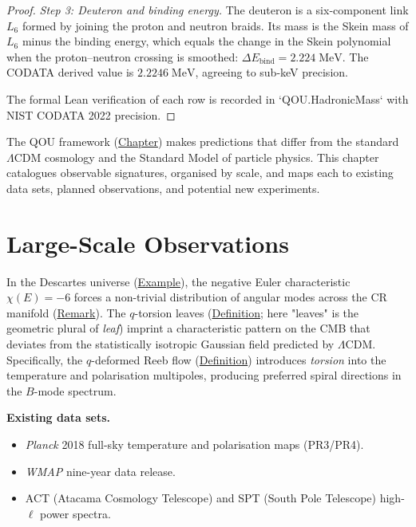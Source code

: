 \begin{proof}
\emph{Step 3: Deuteron and binding energy.}
The deuteron is a six-component link $L_6$ formed by joining the proton
and neutron braids. Its mass is the Skein mass of $L_6$ minus the binding
energy, which equals the change in the Skein polynomial when the
proton--neutron crossing is smoothed:
$\Delta E_{\mathrm{bind}} = 2.224\;\mathrm{MeV}$. The CODATA derived
value is $2.2246\;\mathrm{MeV}$, agreeing to sub-keV precision.

The formal Lean verification of each row is recorded in
`QOU.HadronicMass` with NIST CODATA 2022 precision.
\end{proof}

The QOU framework (\hyperref[chap:qou]{Chapter}) makes predictions that differ from
the standard $\Lambda$CDM cosmology and the Standard Model of particle physics.
This chapter catalogues observable signatures, organised by scale, and maps each
to existing data sets, planned observations, and potential new experiments.

\section{Large-Scale Observations}
\label{sec:large-scale}

\begin{remark}
  \label{rem:cmb-q-torsion}
In the Descartes universe (\hyperref[ex:descartes]{Example}), the negative Euler
characteristic $\chi(E) = -6$ forces a non-trivial distribution of angular
modes across the CR manifold (\hyperref[rem:descartes-cmb]{Remark}). The
$q$-torsion leaves (\hyperref[def:q-torsion-leaf]{Definition}; here "leaves" is the
geometric plural of \emph{leaf}) imprint a
characteristic pattern on the CMB that deviates from the statistically
isotropic Gaussian field predicted by $\Lambda$CDM. Specifically, the
$q$-deformed Reeb flow (\hyperref[def:q-reeb-flow]{Definition}) introduces
\emph{torsion} into the temperature and polarisation multipoles, producing
preferred spiral directions in the $B$-mode spectrum.
\end{remark}

\textbf{Existing data sets.}

\begin{itemize}
  \item \emph{Planck} 2018 full-sky temperature and polarisation maps (PR3/PR4).
  \item \emph{WMAP} nine-year data release.
  \item ACT (Atacama Cosmology Telescope) and SPT (South Pole Telescope) high-$\ell$ power spectra.
\end{itemize}

